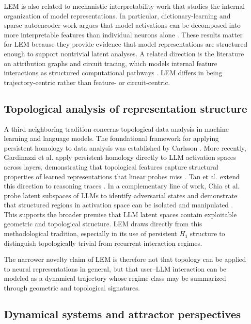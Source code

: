 \documentclass[11pt]{article}
\begin{document}
LEM is also related to mechanistic interpretability work that studies the internal
organization of model representations. In particular, dictionary-learning and
sparse-autoencoder work argues that model activations can be decomposed into more
interpretable features than individual neurons alone
\cite{bricken2023monosemanticity,templeton2024scaling}. These results matter for LEM
because they provide evidence that model representations are structured enough to
support nontrivial latent analyses. A related direction is the literature on
attribution graphs and circuit tracing, which models internal feature interactions
as structured computational pathways \cite{ameisen2025circuittracing}. LEM differs
in being trajectory-centric rather than feature- or circuit-centric.

\subsection{Topological analysis of representation structure}

A third neighboring tradition concerns topological data analysis in machine learning
and language models. The foundational framework for applying persistent homology to
data analysis was established by Carlsson \cite{carlsson2009topology}. More recently,
Gardinazzi et al. apply persistent homology directly to LLM activation spaces across
layers, demonstrating that topological features capture structural properties of
learned representations that linear probes miss \cite{gardinazzi2024persistent}. Tan
et al. extend this direction to reasoning traces \cite{tan2025shape}. In a
complementary line of work, Chia et al. probe latent subspaces of LLMs to identify
adversarial states and demonstrate that structured regions in activation space can be
isolated and manipulated \cite{chia2025probing}. This supports the broader premise
that LLM latent spaces contain exploitable geometric and topological structure. LEM
draws directly from this methodological tradition, especially in its use of persistent
$H_1$ structure to distinguish topologically trivial from recurrent interaction
regimes.

The narrower novelty claim of LEM is therefore not that topology can be applied to
neural representations in general, but that user--LLM interaction can be modeled as a
dynamical trajectory whose regime class may be summarized through geometric and
topological signatures.

\subsection{Dynamical systems and attractor perspectives}
\end{document}
